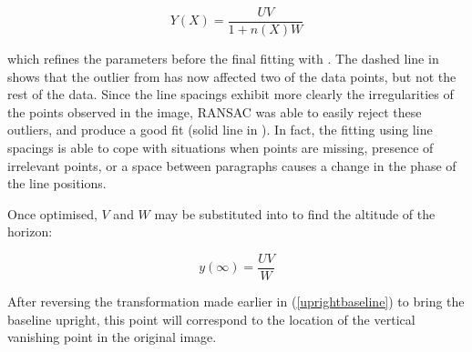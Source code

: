 \begin{equation}
Y(X) = \frac{ UV }{ 1+n(X)W }
\end{equation}

which refines the parameters before the final fitting with .
The dashed line in  shows that the outlier from  has now
affected two of the data points, but not the rest of the data.
Since the line spacings exhibit more clearly the irregularities of the points observed in the image,
RANSAC was able to easily reject these outliers, and produce a good fit (solid line in ).   %
In fact, the fitting using line spacings is able to cope with situations
when points are missing, presence of irrelevant points,
or a space between paragraphs causes a change in the phase of the line positions.



Once optimised, $V$ and $W$ may be substituted into
 to find the altitude of the horizon:
 
\begin{equation}
y(\infty) = \frac{UV} {W}
\end{equation}
 
After reversing the transformation made earlier in (\ref{uprightbaseline}) to
bring the baseline upright, this point will correspond to the location of the
vertical vanishing point in the original image.


